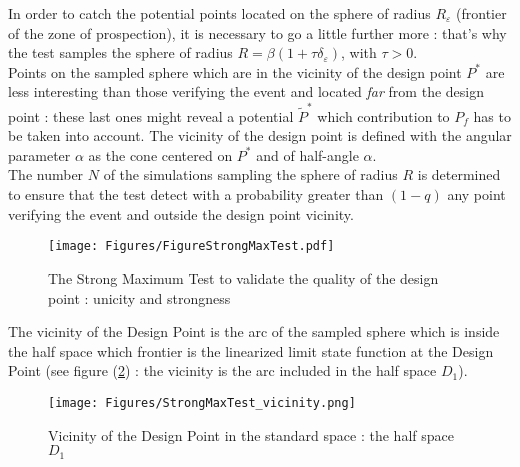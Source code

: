 In order to catch the potential points located on the sphere of radius $R_{\varepsilon}$ (frontier of the zone of prospection), it is necessary to go a little further more : that's why the test samples the sphere of radius  $R = \beta(1+\tau \delta_{\varepsilon})$, with $\tau >0$.\\

Points on the sampled sphere which are in the vicinity of the design point $P^*$ are less interesting than those verifying the event and located {\itshape far} from the design point : these last ones might reveal a potential $\tilde{P}^*$ which contribution to $P_f$ has to be taken into account. The  vicinity of the design point is defined with the angular parameter $\alpha$ as the cone centered on $P^*$ and of half-angle $\alpha$.\\

The number $N$ of the simulations sampling the sphere of radius $R$ is determined  to ensure that the test detect with a probability greater than $(1 - q)$ any point verifying the event and outside the design point vicinity. \\

\begin{figure}[H]
  \begin{center}
    \texttt{[image: Figures/FigureStrongMaxTest.pdf]}
    \caption{The Strong Maximum Test to validate the quality of the design point : unicity and strongness}
    \label{SMT}
  \end{center}
\end{figure}

The vicinity of the Design Point  is the arc of the sampled sphere which is inside the half space which frontier is the linearized limit state function at the Design Point (see figure (\ref{vicinity}) : the vicinity is the arc included in the half space $D_1$).\\

\begin{figure}[H]
  \begin{center}
    \texttt{[image: Figures/StrongMaxTest\_vicinity.png]}
    \caption{Vicinity of the Design Point in the standard space : the half space $D_1$}
    \label{vicinity}
  \end{center}
\end{figure}

